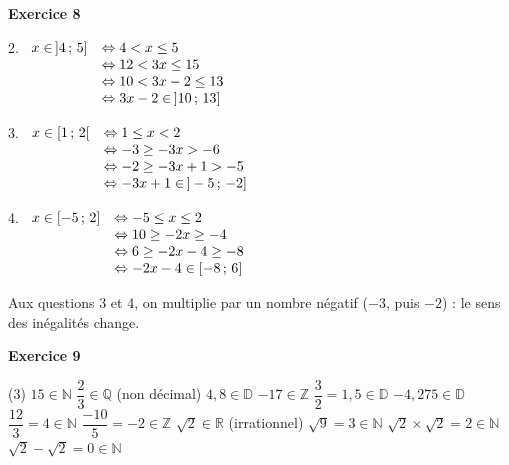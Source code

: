 \documentclass[a4paper,11pt]{article}
\newenvironment{exercice}[1]{%
  \Needspace{6\baselineskip}\par\bigskip\noindent\textbf{Exercice #1}\par\smallskip\noindent\ignorespaces
}{%
  \par
}
\begin{document}
\begin{exercice}{8}
\medskip
\noindent
\begin{minipage}[t]{0.48\textwidth}
2. $\begin{array}[t]{rl}
  x\in\,]4\,;\,5] & \Leftrightarrow 4< x\leq 5\\
  & \Leftrightarrow 12< 3x\leq 15\\
  & \Leftrightarrow 10< 3x-2\leq 13\\
  & \Leftrightarrow 3x-2\in\,]10\,;\,13]
\end{array}$
\end{minipage}
\hfill
\begin{minipage}[t]{0.48\textwidth}
3. $\begin{array}[t]{rl}
  x\in[1\,;\,2[ & \Leftrightarrow 1\leq x< 2\\
  & \Leftrightarrow -3\geq -3x> -6\\
  & \Leftrightarrow -2\geq -3x+1> -5\\
  & \Leftrightarrow -3x+1\in\,]-5\,;\,-2]
\end{array}$
\end{minipage}

\bigskip
\noindent
\begin{minipage}[t]{0.48\textwidth}
4. $\begin{array}[t]{rl}
  x\in[-5\,;\,2] & \Leftrightarrow -5\leq x\leq 2\\
  & \Leftrightarrow 10\geq -2x\geq -4\\
  & \Leftrightarrow 6\geq -2x-4\geq -8\\
  & \Leftrightarrow -2x-4\in[-8\,;\,6]
\end{array}$
\end{minipage}

\medskip
Aux questions 3 et 4, on multiplie par un nombre négatif ($-3$, puis $-2$) : le sens des inégalités change.
\end{exercice}

\begin{exercice}{9}
\begin{tasks}(3)
\task $15\in\mathbb{N}$
\task $\dfrac{2}{3}\in\mathbb{Q}$ \quad (non décimal)
\task $4{,}8\in\mathbb{D}$
\task $-17\in\mathbb{Z}$
\task $\dfrac{3}{2}=1{,}5\in\mathbb{D}$
\task $-4{,}275\in\mathbb{D}$
\task $\dfrac{12}{3}=4\in\mathbb{N}$
\task $\dfrac{-10}{5}=-2\in\mathbb{Z}$
\task $\sqrt{2}\in\mathbb{R}$ \quad (irrationnel)
\task $\sqrt{9}=3\in\mathbb{N}$
\task $\sqrt{2}\times\sqrt{2}=2\in\mathbb{N}$
\task $\sqrt{2}-\sqrt{2}=0\in\mathbb{N}$
\end{tasks}
\end{exercice}
\end{document}
